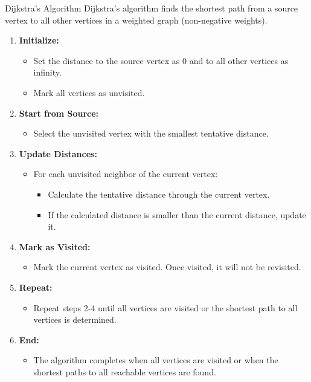 \begin{usage}[]{Dijkstra's Algorithm}
    Dijkstra's algorithm finds the shortest path from a source vertex to all other vertices in a weighted graph (non-negative weights).

    \begin{enumerate}
        \item \textbf{Initialize:}
              \begin{itemize}
                  \item Set the distance to the source vertex as 0 and to all other vertices as infinity.
                  \item Mark all vertices as unvisited.
              \end{itemize}

        \item \textbf{Start from Source:}
              \begin{itemize}
                  \item Select the unvisited vertex with the smallest tentative distance.
              \end{itemize}

        \item \textbf{Update Distances:}
              \begin{itemize}
                  \item For each unvisited neighbor of the current vertex:
                        \begin{itemize}
                            \item Calculate the tentative distance through the current vertex.
                            \item If the calculated distance is smaller than the current distance, update it.
                        \end{itemize}
              \end{itemize}

        \item \textbf{Mark as Visited:}
              \begin{itemize}
                  \item Mark the current vertex as visited. Once visited, it will not be revisited.
              \end{itemize}

        \item \textbf{Repeat:}
              \begin{itemize}
                  \item Repeat steps 2-4 until all vertices are visited or the shortest path to all vertices is determined.
              \end{itemize}

        \item \textbf{End:}
              \begin{itemize}
                  \item The algorithm completes when all vertices are visited or when the shortest paths to all reachable vertices are found.
              \end{itemize}
    \end{enumerate}
\end{usage}
